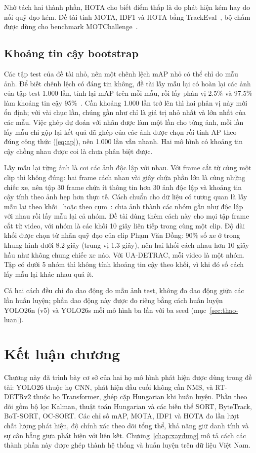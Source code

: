 Nhờ tách hai thành phần, HOTA cho biết điểm thấp là do phát hiện kém hay do nối quỹ đạo kém. Đề tài tính MOTA, IDF1
và HOTA bằng TrackEval~\cite{trackeval}, bộ chấm được dùng cho benchmark MOTChallenge~\cite{milan2016mot16}.

\subsection{Khoảng tin cậy bootstrap}
\label{sec:bootstrap}

Các tập test của đề tài nhỏ, nên một chênh lệch mAP nhỏ có thể chỉ do mẫu ảnh. Để biết chênh lệch có đáng tin không,
đề tài lấy mẫu lại có hoàn lại các ảnh của tập test 1.000 lần, tính lại mAP trên mỗi mẫu, rồi lấy phân vị 2.5\% và
97.5\% làm khoảng tin cậy 95\%~\cite{efron1993bootstrap}. Cần khoảng 1.000 lần trở lên thì hai phân vị này mới ổn định;
với vài chục lần, chúng gần như chỉ là giá trị nhỏ nhất và lớn nhất của các mẫu. Việc ghép dự đoán với nhãn được làm
một lần cho từng ảnh, mỗi lần lấy mẫu chỉ gộp lại kết quả đã ghép của các ảnh được chọn rồi tính AP theo đúng công thức
(\ref{eq:ap}), nên 1.000 lần vẫn nhanh. Hai mô hình có khoảng tin cậy chồng nhau được coi là chưa phân biệt được.

Lấy mẫu lại từng ảnh là coi các ảnh độc lập với nhau. Với frame cắt từ cùng một clip thì không đúng: hai frame cách nhau
vài giây chứa phần lớn là cùng những chiếc xe, nên tập 30 frame chứa ít thông tin hơn 30 ảnh độc lập và khoảng tin cậy
tính theo ảnh hẹp hơn thực tế. Cách chuẩn cho dữ liệu có tương quan là lấy mẫu lại theo khối~\cite{kunsch1989block}
hoặc theo cụm~\cite{field2007cluster}: chia ảnh thành các nhóm gần như độc lập với nhau rồi lấy mẫu lại cả nhóm. Đề tài
dùng thêm cách này cho mọi tập frame cắt từ video, với nhóm là các khối 10 giây liên tiếp trong cùng một clip. Độ dài khối
được chọn từ nhãn quỹ đạo của clip Phạm Văn Đồng: 90\% số xe ở trong khung hình dưới 8.2 giây (trung vị 1.3 giây),
nên hai khối cách nhau hơn 10 giây hầu như không chung chiếc xe nào. Với UA-DETRAC, mỗi video là một nhóm. Tập có dưới 5
nhóm thì không tính khoảng tin cậy theo khối, vì khi đó số cách lấy mẫu lại khác nhau quá ít.

Cả hai cách đều chỉ đo dao động do mẫu ảnh test, không đo dao động giữa các lần huấn luyện; phần dao động này được đo
riêng bằng cách huấn luyện YOLO26n (v5) và YOLO26s mỗi mô hình ba lần với ba seed (mục~\ref{sec:thao-luan}).

\section{Kết luận chương}

Chương này đã trình bày cơ sở của hai họ mô hình phát hiện được dùng trong đề tài: YOLO26 thuộc họ CNN, phát hiện đầu
cuối không cần NMS, và RT-DETRv2 thuộc họ Transformer, ghép cặp Hungarian khi huấn luyện. Phần theo dõi gồm bộ lọc
Kalman, thuật toán Hungarian và các biến thể SORT, ByteTrack, BoT-SORT, OC-SORT. Các chỉ số mAP, MOTA, IDF1 và HOTA đo
lần lượt chất lượng phát hiện, độ chính xác theo dõi tổng thể, khả năng giữ danh tính và sự cân bằng giữa phát hiện
với liên kết. Chương~\ref{chap:xaydung} mô tả cách các thành phần này được ghép thành hệ thống và huấn luyện trên dữ
liệu Việt Nam.
